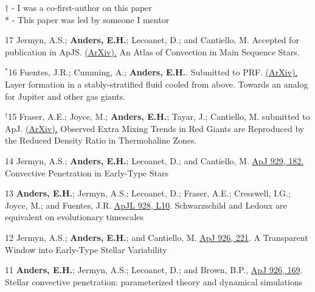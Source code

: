 \newpage
{}


\hspace{\smallsephintwidth}$\dagger$ - I was a co-first-author on this paper \\
\hspace{\smallsephintwidth}$*$ - This paper was led by someone I mentor
\vspace{0.3cm}

	  {17}
	  {
		Jermyn, A.S.; \textbf{Anders, E.H.}; Lecoanet, D.; and Cantiello, M. Accepted for publication in ApJS.
        \href{https://arxiv.org/abs/2206.00011}{(ArXiv).}
       }
	  {An Atlas of Convection in Main Sequence Stars.}

\cvpub{}
      {$^*$16}
      {
        Fuentes, J.R.; Cumming, A.; \textbf{Anders, E.H.}. Submitted to PRF.
        \href{https://arxiv.org/abs/2204.12643}{(ArXiv).}
      }
      {Layer formation in a stably-stratified fluid cooled from above. Towards an analog for Jupiter and other gas giants.}

\cvpub{}
      {$^\dagger$15}
      {
        Fraser, A.E.; Joyce, M.; \textbf{Anders, E.H.}; Tayar, J.; Cantiello, M. submitted to ApJ.
        \href{https://arxiv.org/abs/2204.08487}{(ArXiv).}
      }
      {Observed Extra Mixing Trends in Red Giants are Reproduced by the Reduced Density Ratio in Thermohaline Zones.}

\cvpub{}
	  {14}
	  {
		Jermyn, A.S.; \textbf{Anders, E.H.}; Lecoanet, D.; and Cantiello, M. 
        \href{https://iopscience.iop.org/article/10.3847/1538-4357/ac5f08}{ApJ 929, 182.}
	  }
	  {Convective Penetration in Early-Type Stars}

\cvpub{}
	  {13}
	  {
		\textbf{Anders, E.H.}; Jermyn, A.S.; Lecoanet, D.; Fraser, A.E.; Cresswell, I.G.; Joyce, M.; and Fuentes, J.R. 
        \href{https://iopscience.iop.org/article/10.3847/2041-8213/ac5cb5}{ApJL 928, L10}.
	  }
	  {Schwarzschild and Ledoux are equivalent on evolutionary timescales}

\cvpub{}
	  {12}
	  {
		Jermyn, A.S.; \textbf{Anders, E.H.}; and Cantiello, M. 
        \href{https://iopscience.iop.org/article/10.3847/1538-4357/ac4e89}{ApJ 926, 221}.
	  }
	  {A Transparent Window into Early-Type Stellar Variability}

\cvpub{}
	  {11}
	  {
		\textbf{Anders, E.H.}; Jermyn, A.S.; Lecoanet, D.; and Brown, B.P., 
        \href{https://iopscience.iop.org/article/10.3847/1538-4357/ac408d}{ApJ 926, 169}.
	  }
	  {Stellar convective penetration: parameterized theory and dynamical simulations}

